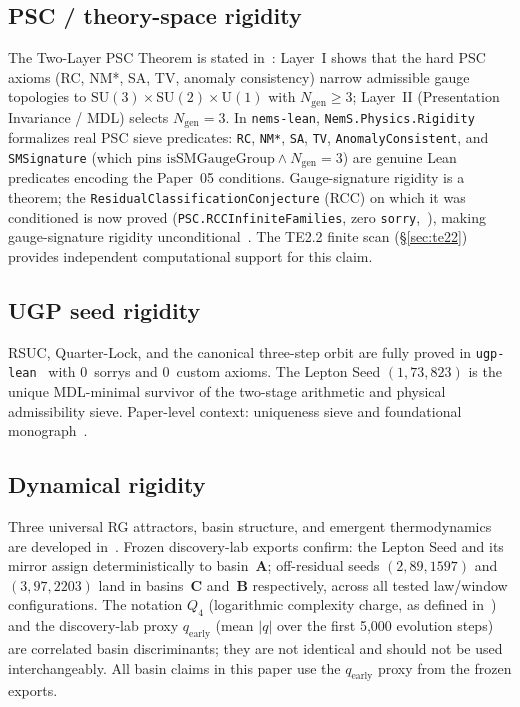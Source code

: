 \documentclass[11pt,twocolumn]{article}
\theoremstyle{remark}
\begin{document}
\subsection{PSC / theory-space rigidity}
The Two-Layer PSC Theorem is stated in~\cite{SpivackPhysicsPortal,Spivack2025_FirstPrinciplesSM}:
Layer~I shows that the hard PSC axioms (RC, NM*, SA, TV, anomaly consistency) narrow admissible
gauge topologies to $\mathrm{SU}(3)\times\mathrm{SU}(2)\times\mathrm{U}(1)$ with
$N_{\mathrm{gen}}\geq 3$; Layer~II (Presentation Invariance / MDL) selects $N_{\mathrm{gen}}=3$.
In \texttt{nems-lean}, \texttt{NemS.Physics.Rigidity} formalizes real PSC sieve predicates:
\texttt{RC}, \texttt{NM*}, \texttt{SA}, \texttt{TV}, \texttt{AnomalyConsistent}, and
\texttt{SMSignature} (which pins $\mathrm{isSMGaugeGroup}\wedge N_{\mathrm{gen}}=3$) are genuine
Lean predicates encoding the Paper~05 conditions.
Gauge-signature rigidity is a theorem; the \texttt{ResidualClassificationConjecture}
(RCC) on which it was conditioned is now proved (\texttt{PSC.RCCInfiniteFamilies}, zero \texttt{sorry},~\cite{ugp-lean}), making gauge-signature rigidity unconditional~\cite{unified-rigidity-lean}.
The TE2.2 finite scan (§\ref{sec:te22}) provides independent computational support for this
claim.

\subsection{UGP seed rigidity}
RSUC, Quarter-Lock, and the canonical three-step orbit are fully proved in
\texttt{ugp-lean}~\cite{ugp-lean,SpivackUGPFormalization} with 0~sorrys and 0~custom axioms.
The Lepton Seed $(1,73,823)$ is the unique MDL-minimal survivor of the two-stage arithmetic and
physical admissibility sieve.
Paper-level context: uniqueness sieve and foundational
monograph~\cite{Spivack2025_UGPUniqueness,spivack2025main_ugp_paper}.

\subsection{Dynamical rigidity}
Three universal RG attractors, basin structure, and emergent thermodynamics are developed
in~\cite{spivack2025dynamics_universality,Spivack2025_UGPDynamicsUniversality}.
Frozen discovery-lab exports confirm: the Lepton Seed and its mirror assign deterministically to
basin~\textbf{A}; off-residual seeds $(2,89,1597)$ and $(3,97,2203)$ land in basins~\textbf{C}
and~\textbf{B} respectively, across all tested law/window configurations.
The notation $Q_4$ (logarithmic complexity charge, as defined in~\cite{spivack2025dynamics_universality})
and the discovery-lab proxy $q_{\mathrm{early}}$ (mean $|q|$ over the first 5{,}000 evolution
steps) are correlated basin discriminants; they are not identical and should not be used
interchangeably.
All basin claims in this paper use the $q_{\mathrm{early}}$ proxy from the frozen exports.
\end{document}
